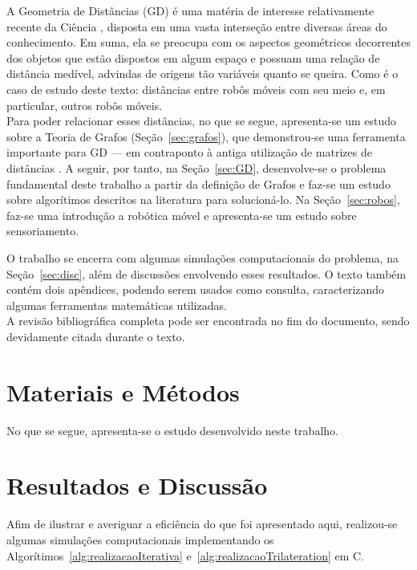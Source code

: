 \documentclass[a4paper,12pt]{article}
\begin{document}
	A Geometria de Distâncias (GD) é uma matéria de interesse relativamente recente da Ciência \cite{carlileGDandAplications}, disposta em uma vasta interseção entre diversas áreas do conhecimento. Em suma, ela se preocupa com os aspectos geométricos decorrentes dos objetos que estão dispostos em algum espaço e possuam uma relação de distância medível, advindas de origens tão variáveis quanto se queira. Como é o caso de estudo deste texto: distâncias entre robôs móveis com seu meio e, em particular, outros robôs móveis.
	\\
	
	Para poder relacionar esses distâncias, no que se segue, apresenta-se um estudo sobre a Teoria de Grafos (Seção~\ref{sec:grafos}), que demonstrou-se uma ferramenta importante para GD --- em contraponto à antiga utilização de matrizes de distâncias \cite{carlileGDandAplications}. A seguir, por tanto, na Seção~\ref{sec:GD}, desenvolve-se o problema fundamental deste trabalho a partir da definição de Grafos e faz-se um estudo sobre algorítimos descritos na literatura para solucioná-lo. Na Seção~\ref{sec:robos}, faz-se uma introdução a robótica móvel e apresenta-se um estudo sobre sensoriamento. 
	
	O trabalho se encerra com algumas simulações computacionais do problema, na Seção~\ref{sec:disc}, além de discussões envolvendo esses resultados. O texto também contém dois apêndices, podendo serem usados como consulta, caracterizando algumas ferramentas matemáticas utilizadas. 
	\\
	
	A revisão bibliográfica completa pode ser encontrada no fim do documento, sendo devidamente citada durante o texto. 
	
	\newpage
	
	\section*{Materiais e Métodos}
	No que se segue, apresenta-se o estudo desenvolvido neste trabalho.
	
	
	
	\newpage
	
	
	
	\newpage
	
	

	\newpage
	\section{Resultados e Discussão \label{sec:disc}}
	Afim de ilustrar e averiguar a eficiência do que foi apresentado aqui, realizou-se algumas simulações computacionais implementando os Algorítimos~\ref{alg:realizacaoIterativa} e~\ref{alg:realizacaoTrilateration} em C. 
	\\
	
\end{document}

